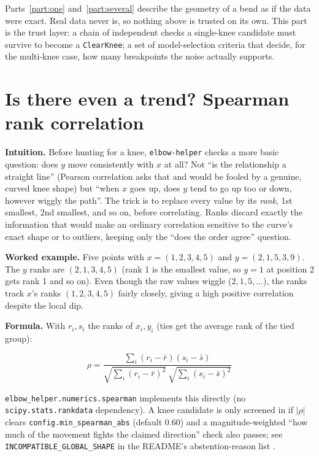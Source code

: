 \documentclass[11pt]{article}
\newcommand{\code}[1]{\texttt{#1}}
\begin{document}
Parts~\ref{part:one} and~\ref{part:several} describe the geometry of a bend
as if the data were exact. Real data never is, so nothing above is trusted
on its own. This part is the trust layer: a chain of independent checks a
single-knee candidate must survive to become a \code{ClearKnee}; a set
of model-selection criteria that decide, for the multi-knee case, how many
breakpoints the noise actually supports.

\section{Is there even a trend? Spearman rank correlation}

\textbf{Intuition.} Before hunting for a knee, \code{elbow-helper} checks a
more basic question: does $y$ move consistently with $x$ at all? Not ``is
the relationship a straight line'' (Pearson correlation asks that and
would be fooled by a genuine, curved knee shape) but ``when $x$ goes up,
does $y$ tend to go up too or down, however wiggly the path''. The trick is
to replace every value by its \emph{rank}, 1st smallest, 2nd smallest, and
so on, before correlating. Ranks discard exactly the information that would
make an ordinary correlation sensitive to the curve's exact shape or to
outliers, keeping only the ``does the order agree'' question.

\textbf{Worked example.} Five points with $x = (1,2,3,4,5)$ and $y =
(2,1,5,3,9)$. The $y$ ranks are $(2,1,3,4,5)$ (rank 1 is the smallest
value, so $y=1$ at position 2 gets rank 1 and so on). Even though the raw
values wiggle ($2, 1, 5, \dots$), the ranks track $x$'s ranks $(1,2,3,4,5)$
fairly closely, giving a high positive correlation despite the local dip.

\textbf{Formula.} With $r_i, s_i$ the ranks of $x_i, y_i$ (ties get the
average rank of the tied group):

\begin{equation}
\rho = \frac{\sum_i (r_i - \bar r)(s_i - \bar s)}{\sqrt{\sum_i (r_i - \bar r)^2}\ \sqrt{\sum_i (s_i - \bar s)^2}}
\end{equation}

\code{elbow\_helper.numerics.spearman} implements this directly (no
\code{scipy.stats.rankdata} dependency). A knee candidate is only screened
in if $|\rho|$ clears \code{config.min\_spearman\_abs} (default $0.60$) and
a magnitude-weighted ``how much of the movement fights the claimed
direction'' check also passes; see \code{INCOMPATIBLE\_GLOBAL\_SHAPE} in
the README's abstention-reason list \citep{spearman1904}.
\end{document}
